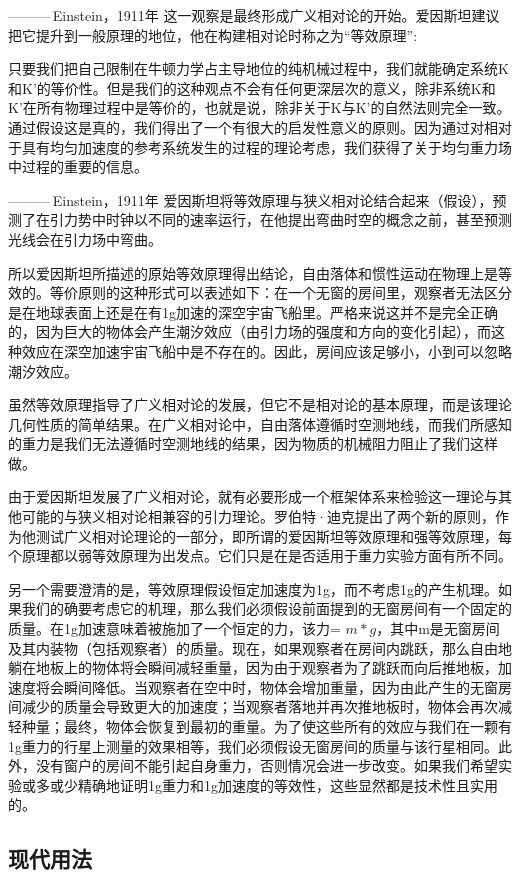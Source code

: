 ——— Einstein，1911年
这一观察是最终形成广义相对论的开始。爱因斯坦建议把它提升到一般原理的地位，他在构建相对论时称之为“等效原理”:

只要我们把自己限制在牛顿力学占主导地位的纯机械过程中，我们就能确定系统K和K’的等价性。但是我们的这种观点不会有任何更深层次的意义，除非系统K和K’在所有物理过程中是等价的，也就是说，除非关于K与K’的自然法则完全一致。通过假设这是真的，我们得出了一个有很大的启发性意义的原则。因为通过对相对于具有均匀加速度的参考系统发生的过程的理论考虑，我们获得了关于均匀重力场中过程的重要的信息。

——— Einstein，1911年
爱因斯坦将等效原理与狭义相对论结合起来（假设），预测了在引力势中时钟以不同的速率运行，在他提出弯曲时空的概念之前，甚至预测光线会在引力场中弯曲。

所以爱因斯坦所描述的原始等效原理得出结论，自由落体和惯性运动在物理上是等效的。等价原则的这种形式可以表述如下：在一个无窗的房间里，观察者无法区分是在地球表面上还是在有1g加速的深空宇宙飞船里。严格来说这并不是完全正确的，因为巨大的物体会产生潮汐效应（由引力场的强度和方向的变化引起），而这种效应在深空加速宇宙飞船中是不存在的。因此，房间应该足够小，小到可以忽略潮汐效应。

虽然等效原理指导了广义相对论的发展，但它不是相对论的基本原理，而是该理论几何性质的简单结果。在广义相对论中，自由落体遵循时空测地线，而我们所感知的重力是我们无法遵循时空测地线的结果，因为物质的机械阻力阻止了我们这样做。

由于爱因斯坦发展了广义相对论，就有必要形成一个框架体系来检验这一理论与其他可能的与狭义相对论相兼容的引力理论。罗伯特·迪克提出了两个新的原则，作为他测试广义相对论理论的一部分，即所谓的爱因斯坦等效原理和强等效原理，每个原理都以弱等效原理为出发点。它们只是在是否适用于重力实验方面有所不同。

另一个需要澄清的是，等效原理假设恒定加速度为1g，而不考虑1g的产生机理。如果我们的确要考虑它的机理，那么我们必须假设前面提到的无窗房间有一个固定的质量。在1g加速意味着被施加了一个恒定的力，该力= $m*g$，其中m是无窗房间及其内装物（包括观察者）的质量。现在，如果观察者在房间内跳跃，那么自由地躺在地板上的物体将会瞬间减轻重量，因为由于观察者为了跳跃而向后推地板，加速度将会瞬间降低。当观察者在空中时，物体会增加重量，因为由此产生的无窗房间减少的质量会导致更大的加速度；当观察者落地并再次推地板时，物体会再次减轻种量；最终，物体会恢复到最初的重量。为了使这些所有的效应与我们在一颗有1g重力的行星上测量的效果相等，我们必须假设无窗房间的质量与该行星相同。此外，没有窗户的房间不能引起自身重力，否则情况会进一步改变。如果我们希望实验或多或少精确地证明1g重力和1g加速度的等效性，这些显然都是技术性且实用的。
\subsection{现代用法}

